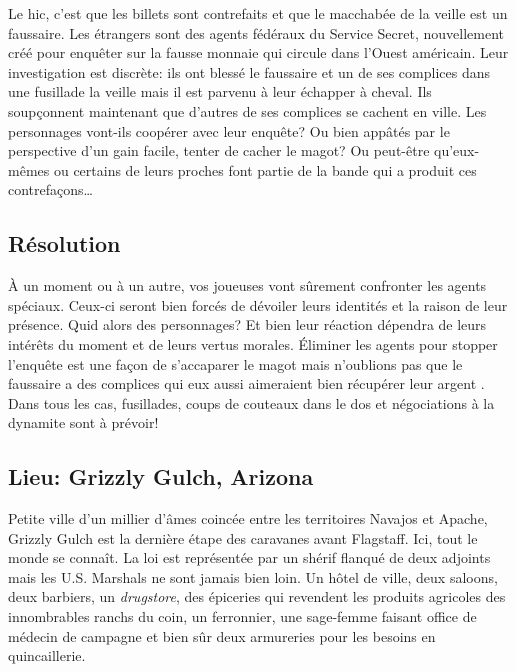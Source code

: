 Le hic, c'est que les billets sont contrefaits et que le macchabée de la veille est un faussaire.
Les étrangers sont des agents fédéraux du Service Secret, nouvellement créé pour enquêter sur la fausse monnaie qui circule dans l'Ouest américain.
Leur investigation est discrète: ils ont blessé le faussaire et un de ses complices dans une fusillade la veille mais il est parvenu à leur échapper à cheval.
Ils soupçonnent maintenant que d'autres de ses complices se cachent en ville.
Les personnages vont-ils coopérer avec leur enquête?
Ou bien appâtés par le perspective d'un gain facile, tenter de cacher le magot?
Ou peut-être qu'eux-mêmes ou certains de leurs proches font partie de la bande qui a produit ces contrefaçons\dots

\subsection{Résolution}

À un moment ou à un autre, vos joueuses vont sûrement confronter les agents spéciaux.
Ceux-ci seront bien forcés de dévoiler leurs identités et la raison de leur présence.
Quid alors des personnages? Et bien leur réaction dépendra de leurs intérêts du moment et de leurs vertus morales.
Éliminer les agents pour stopper l'enquête est une façon de s'accaparer le magot mais n'oublions pas que le faussaire a des complices qui eux aussi aimeraient bien récupérer leur \og argent \fg.
Dans tous les cas, fusillades, coups de couteaux dans le dos et négociations à la dynamite sont à prévoir!

\subsection{Lieu: Grizzly Gulch, Arizona}

\begin{tcolorbox}[colback=black!1!white]
Petite ville d'un millier d'âmes coincée entre les territoires Navajos et Apache, Grizzly Gulch est la dernière étape des caravanes avant Flagstaff.
Ici, tout le monde se connaît. La loi est représentée par un shérif flanqué de deux adjoints mais les U.S. Marshals ne sont jamais bien loin.
Un hôtel de ville, deux saloons, deux barbiers, un \emph{drugstore}, des épiceries qui revendent les produits agricoles des innombrables ranchs du coin, un ferronnier, une sage-femme faisant office de médecin de campagne et bien sûr deux armureries pour les besoins en quincaillerie.
\end{tcolorbox}

\vfill
{}
\vfill
